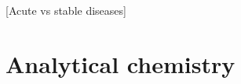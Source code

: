 \begin{DoubleSpace*}
 \cite{johnson2016}

[Acute vs stable diseases]

\section{Analytical chemistry}
\end{DoubleSpace*}